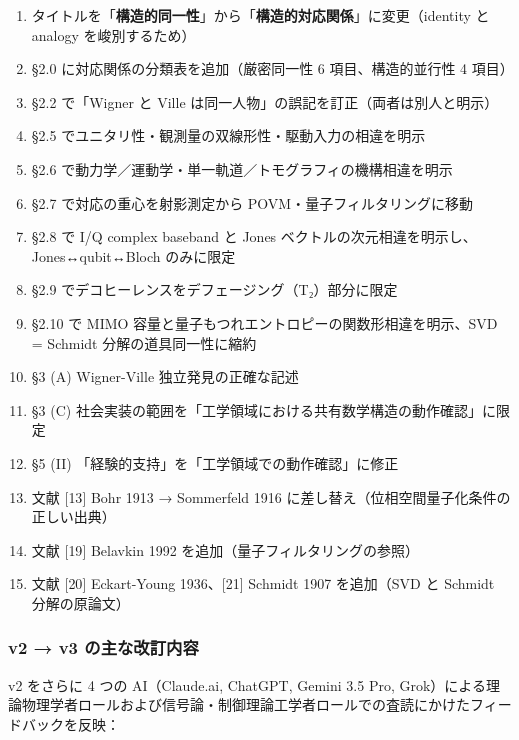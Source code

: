 \documentclass[
]{ltjsarticle}
\providecommand{\tightlist}{%
  \setlength{\itemsep}{0pt}\setlength{\parskip}{0pt}}
\begin{document}
\begin{enumerate}
\def\labelenumi{\arabic{enumi}.}
\tightlist
\item
  タイトルを「\textbf{構造的同一性}」から「\textbf{構造的対応関係}」に変更（identity
  と analogy を峻別するため）
\item
  §2.0 に対応関係の分類表を追加（厳密同一性 6 項目、構造的並行性 4
  項目）
\item
  §2.2 で「Wigner と Ville は同一人物」の誤記を訂正（両者は別人と明示）
\item
  §2.5 でユニタリ性・観測量の双線形性・駆動入力の相違を明示
\item
  §2.6 で動力学／運動学・単一軌道／トモグラフィの機構相違を明示
\item
  §2.7 で対応の重心を射影測定から POVM・量子フィルタリングに移動
\item
  §2.8 で I/Q complex baseband と Jones
  ベクトルの次元相違を明示し、Jones↔qubit↔Bloch のみに限定
\item
  §2.9 でデコヒーレンスをデフェージング（T₂）部分に限定
\item
  §2.10 で MIMO 容量と量子もつれエントロピーの関数形相違を明示、SVD =
  Schmidt 分解の道具同一性に縮約
\item
  §3 (A) Wigner-Ville 独立発見の正確な記述
\item
  §3 (C)
  社会実装の範囲を「工学領域における共有数学構造の動作確認」に限定
\item
  §5 (II) 「経験的支持」を「工学領域での動作確認」に修正
\item
  文献 {[}13{]} Bohr 1913 → Sommerfeld 1916
  に差し替え（位相空間量子化条件の正しい出典）
\item
  文献 {[}19{]} Belavkin 1992 を追加（量子フィルタリングの参照）
\item
  文献 {[}20{]} Eckart-Young 1936、{[}21{]} Schmidt 1907 を追加（SVD と
  Schmidt 分解の原論文）
\end{enumerate}

\subsubsection{v2 → v3
の主な改訂内容}\label{v2-v3-ux306eux4e3bux306aux6539ux8a02ux5185ux5bb9}

v2 をさらに 4 つの AI（Claude.ai, ChatGPT, Gemini 3.5 Pro,
Grok）による理論物理学者ロールおよび信号論・制御理論工学者ロールでの査読にかけたフィードバックを反映：
\end{document}
